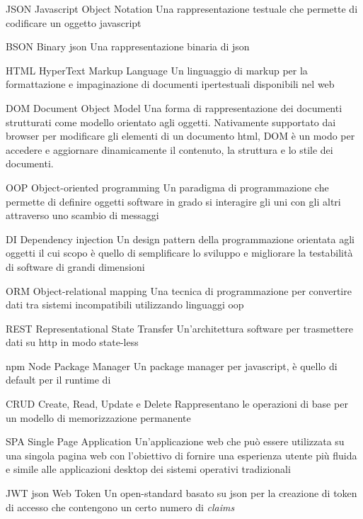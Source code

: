 {JSON}
{Javascript Object Notation}
{Una rappresentazione testuale che permette di codificare un oggetto \gls{javascript}}


{BSON}
{Binary \acrshort{json}}
{Una rappresentazione binaria di \gls{json}}


{HTML}
{HyperText Markup Language}
{Un linguaggio di markup per la formattazione e impaginazione di documenti ipertestuali disponibili nel web}

{DOM}
{Document Object Model}
{Una forma di rappresentazione dei documenti strutturati come modello orientato agli oggetti. Nativamente supportato dai browser per modificare gli elementi di un documento \acrshort{html}, DOM è un modo per accedere e aggiornare dinamicamente il contenuto, la struttura e lo stile dei documenti.}


{OOP}
{Object-oriented programming}
{Un paradigma di programmazione che permette di definire oggetti software in grado si interagire gli uni con gli altri attraverso uno scambio di messaggi}


{DI}
{Dependency injection}
{Un design pattern della programmazione orientata agli oggetti il cui scopo è quello di semplificare lo sviluppo e migliorare la testabilità di software di grandi dimensioni}

{ORM}
{Object-relational mapping}
{Una tecnica di programmazione per convertire dati tra sistemi incompatibili utilizzando linguaggi \gls{oop}}


{REST}
{Representational State Transfer}
{Un'architettura software per trasmettere dati su \acrshort{http} in modo state-less}


{npm}
{Node Package Manager}
{Un package manager per \gls{javascript}, è quello di default per il runtime di \nodejs}



{CRUD}
{Create, Read, Update e Delete}
{Rappresentano le operazioni di base per un modello di memorizzazione permanente}


{SPA}
{Single Page Application}
{Un'applicazione web che può essere utilizzata su una singola pagina web con l'obiettivo di fornire una esperienza utente più fluida e simile alle applicazioni desktop dei sistemi operativi tradizionali}

{JWT}
{\acrshort{json} Web Token}
{Un open-standard basato su \acrshort{json} per la creazione di token di accesso che contengono un certo numero di \textit{claims}}

